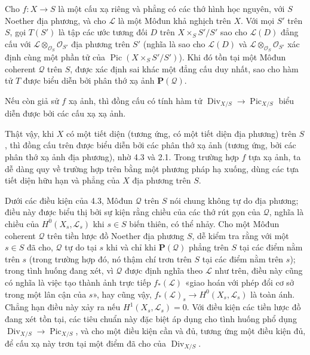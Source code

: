  Cho $f:X\longrightarrow S$ là một cấu xạ riêng và phẳng
có các thớ hình học nguyên, với $S$ Noether địa phương, và cho $\mathcal L$ là
một Môđun khả nghịch trên $X$. Với mọi $S'$ trên $S$, gọi $T(S')$ là tập các
ước tương đối $D$ trên $X\times_SS'/S'$ sao cho $\mathcal L(D)$ đẳng cấu với
$\mathcal L\otimes_{\mathcal O_S}\mathcal O_{S'}$ địa phương trên $S'$ (nghĩa
là sao cho $\mathcal L(D)$ và
$\mathcal L\otimes_{\mathcal O_S}\mathcal O_{S'}$ xác định cùng một phần tử
của $\operatorname{Pic}(X\times_SS'/S')$). Khi đó tồn tại một Môđun coherent
$\mathcal Q$ trên $S$, được xác định sai khác một đẳng cấu duy nhất, sao cho
hàm tử $T$ được biểu diễn bởi phân thớ xạ ảnh $\mathbf P(\mathcal Q)$.

 Nếu còn giả sử $f$ xạ ảnh, thì đồng cấu có tính hàm tử
$\operatorname{Div}_{X/S}\longrightarrow\operatorname{Pic}_{X/S}$ biểu diễn
được bởi các cấu xạ xạ ảnh.

Thật vậy, khi $X$ có một tiết diện (tương ứng, có một tiết diện địa phương)
trên $S$, thì đồng cấu trên được biểu diễn bởi các phân thớ xạ ảnh (tương ứng,
bởi các phân thớ xạ ảnh địa phương), nhờ 4.3 và 2.1. Trong trường hợp $f$ tựa
xạ ảnh, ta dễ dàng quy về trường hợp trên bằng một phương pháp hạ xuống, dùng
các tựa tiết diện hữu hạn và phẳng của $X$ địa phương trên $S$.

 Dưới các điều kiện của 4.3, Môđun $\mathcal Q$ trên
$S$ nói chung không tự do địa phương; điều này được biểu thị bởi sự kiện rằng
chiều của các thớ rút gọn của $\mathcal Q$, nghĩa là chiều của
$H^0(X_s,\mathcal L_s)$ khi $s\in S$ biến thiên, có thể nhảy. Cho một Môđun
coherent $\mathcal Q$ trên tiền lược đồ Noether địa phương $S$, dễ kiểm tra
rằng với một $s\in S$ đã cho, $\mathcal Q$ tự do tại $s$ khi và chỉ khi
$\mathbf P(\mathcal Q)$ phẳng trên $S$ tại các điểm nằm trên $s$ (trong trường
hợp đó, nó thậm chí trơn trên $S$ tại các điểm nằm trên $s$); trong tình huống
đang xét, vì $\mathcal Q$ được định nghĩa theo $\mathcal L$ như trên, điều này
cũng có nghĩa là việc tạo thành ảnh trực tiếp $f_*(\mathcal L)$ «giao hoán với
phép đổi cơ sở trong
một lân cận của $s$», hay cũng vậy,
$f_*(\mathcal L)_s\longrightarrow H^0(X_s,\mathcal L_s)$ là toàn ánh. Chẳng
hạn điều này xảy ra nếu $H^1(X_s,\mathcal L_s)=0$. Với điều kiện các tiền lược
đồ đang xét tồn tại, các tiêu chuẩn này đặc biệt áp dụng cho tình huống phổ
dụng $\operatorname{Div}_{X/S}\longrightarrow\operatorname{Pic}_{X/S}$, và
cho một điều kiện cần và đủ, tương ứng một điều kiện đủ, để cấu xạ này trơn tại
một điểm đã cho của $\operatorname{Div}_{X/S}$.

